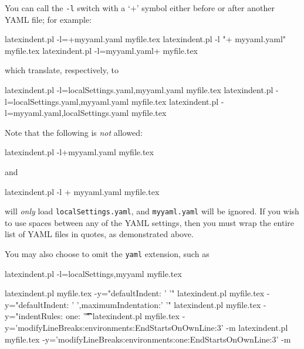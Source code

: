  You can call the \texttt{-l} switch with a `+' symbol either before or after
  another YAML file; for example:

 \begin{commandshell}
latexindent.pl -l=+myyaml.yaml myfile.tex
latexindent.pl -l "+ myyaml.yaml" myfile.tex
latexindent.pl -l=myyaml.yaml+  myfile.tex
\end{commandshell}

 which translate, respectively, to

 \begin{commandshell}
latexindent.pl -l=localSettings.yaml,myyaml.yaml myfile.tex
latexindent.pl -l=localSettings.yaml,myyaml.yaml myfile.tex
latexindent.pl -l=myyaml.yaml,localSettings.yaml myfile.tex
\end{commandshell}

 Note that the following is \emph{not} allowed:

 \begin{commandshell}
latexindent.pl -l+myyaml.yaml myfile.tex
\end{commandshell}

 and

 \begin{commandshell}
latexindent.pl -l + myyaml.yaml myfile.tex
\end{commandshell}

 will \emph{only} load \texttt{localSettings.yaml}, and \texttt{myyaml.yaml} will be
 ignored. If you wish to use spaces between any of the YAML settings, then you must wrap
 the entire list of YAML files in quotes, as demonstrated above.

 You may also choose to omit the \texttt{yaml} extension, such as

 \begin{commandshell}
latexindent.pl -l=localSettings,myyaml myfile.tex
\end{commandshell}


 \begin{commandshell}
latexindent.pl myfile.tex -y="defaultIndent: ' '"
latexindent.pl myfile.tex -y="defaultIndent: ' ',maximumIndentation:' '"
latexindent.pl myfile.tex -y="indentRules: one: '\t\t\t\t'"
latexindent.pl myfile.tex -y='modifyLineBreaks:environments:EndStartsOnOwnLine:3' -m
latexindent.pl myfile.tex -y='modifyLineBreaks:environments:one:EndStartsOnOwnLine:3' -m
\end{commandshell}

